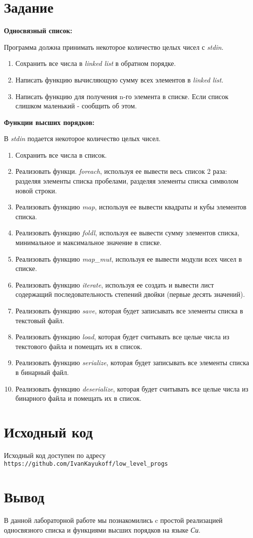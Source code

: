 \documentclass[listings]{labreport}
\begin{document}
\maketitlepage

\section*{Задание}

\textbf{Односвязный список:}

Программа должна принимать некоторое количество целых чисел с \textit{stdin}.
\begin{enumerate}
  \item Сохранить все числа в \textit{linked list} в обратном порядке.
  \item Написать функцию вычисляющую сумму всех элементов в 
    \textit{linked list}.
  \item Написать функцию для получения n-го элемента в списке. Если список
    слишком маленький - сообщить об этом.
\end{enumerate}

\textbf{Функции высших порядков:}

В \textit{stdin} подается некоторое количество целых чисел.
\begin{enumerate}
  \item Сохранить все числа в список.
  \item Реализовать функци. \textit{foreach}, используя ее вывести весь 
    список 2 раза: разделяя элементы списка пробелами, разделяя элементы 
    списка символом новой строки.
  \item Реализовать функцию \textit{map}, используя ее вывести квадраты и 
    кубы элементов списка.
  \item Реализовать функцию \textit{foldl}, используя ее вывести сумму 
    элементов списка, минимальное и максимальное значение в списке.
  \item Реализовать функцию \textit{map\_mut}, используя ее вывести модули 
    всех чисел в списке.
  \item Реализовать функцию \textit{iterate}, используя ее создать и вывести
    лист содержащий последовательность степений двойки (первые десять
    значений).
  \item Реализовать функцию \textit{save}, которая будет записывать все 
    элементы списка в текстовый файл.
  \item Реализовать функцию \textit{load}, которая будет считывать все целые
    числа из текстового файла и помещать их в список.
  \item Реализовать функцию \textit{serialize}, которая будет записывать все 
    элементы списка в бинарный файл.
  \item Реализовать функцию \textit{deserialize}, которая будет считывать 
    все целые числа из бинарного файла и помещать их в список.
\end{enumerate}

\section*{Исходный код}

Исходный код доступен по адресу 
\texttt{https://github.com/IvanKayukoff/low\_level\_progs}

\section*{Вывод}

В данной лабораторной работе мы познакомились c простой
реализацией односвязного списка и функциями высших порядков на языке 
\textit{Си}.
\end{document}
